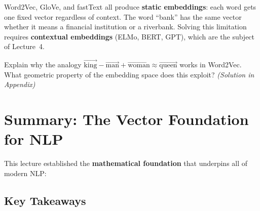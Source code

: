 \documentclass[11pt,a4paper]{article}
\begin{document}
\begin{tcolorbox}[warnbox={Limitation of All Three Methods}]
Word2Vec, GloVe, and fastText all produce \textbf{static embeddings}: each word gets one fixed vector regardless of context. The word ``bank'' has the same vector whether it means a financial institution or a riverbank. Solving this limitation requires \textbf{contextual embeddings} (ELMo, BERT, GPT), which are the subject of Lecture~4.
\end{tcolorbox}

\begin{tcolorbox}[questionbox={Self-Check Q6}]
Explain why the analogy $\vec{\text{king}} - \vec{\text{man}} + \vec{\text{woman}} \approx \vec{\text{queen}}$ works in Word2Vec. What geometric property of the embedding space does this exploit? \textit{(Solution in Appendix)}
\end{tcolorbox}

\section{Summary: The Vector Foundation for NLP}

This lecture established the \textbf{mathematical foundation} that underpins all of modern NLP:

\begin{center}
\end{center}

\subsection{Key Takeaways}
\end{document}
